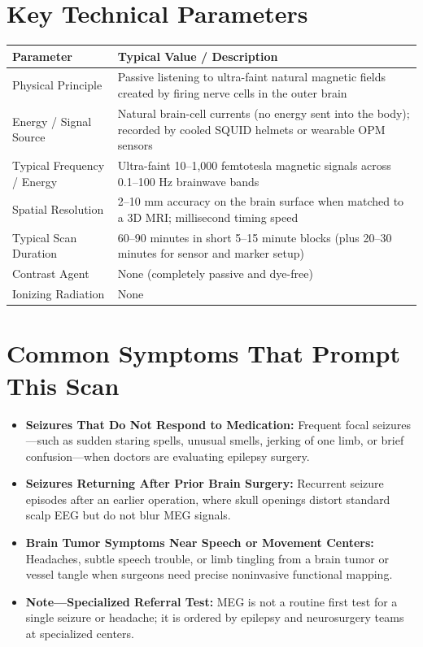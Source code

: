 \section{Key Technical Parameters}
\noindent
\begin{tabularx}{\textwidth}{@{}l X@{}}
\toprule
\textbf{Parameter} & \textbf{Typical Value / Description} \\
\midrule
Physical Principle & Passive listening to ultra-faint natural magnetic fields created by firing nerve cells in the outer brain \\
Energy / Signal Source & Natural brain-cell currents (no energy sent into the body); recorded by cooled SQUID helmets or wearable OPM sensors \\
Typical Frequency / Energy & Ultra-faint 10--1,000 femtotesla magnetic signals across 0.1--100 Hz brainwave bands \\
Spatial Resolution & 2--10 mm accuracy on the brain surface when matched to a 3D MRI; millisecond timing speed \\
Typical Scan Duration & 60--90 minutes in short 5--15 minute blocks (plus 20--30 minutes for sensor and marker setup) \\
Contrast Agent & None (completely passive and dye-free) \\
Ionizing Radiation & None \\
\bottomrule
\end{tabularx}

\section{Common Symptoms That Prompt This Scan}
\begin{itemize}
  \item \textbf{Seizures That Do Not Respond to Medication:} Frequent focal seizures---such as sudden staring spells, unusual smells, jerking of one limb, or brief confusion---when doctors are evaluating epilepsy surgery.
  \item \textbf{Seizures Returning After Prior Brain Surgery:} Recurrent seizure episodes after an earlier operation, where skull openings distort standard scalp EEG but do not blur MEG signals.
  \item \textbf{Brain Tumor Symptoms Near Speech or Movement Centers:} Headaches, subtle speech trouble, or limb tingling from a brain tumor or vessel tangle when surgeons need precise noninvasive functional mapping.
  \item \textbf{Note---Specialized Referral Test:} MEG is not a routine first test for a single seizure or headache; it is ordered by epilepsy and neurosurgery teams at specialized centers.
\end{itemize}

